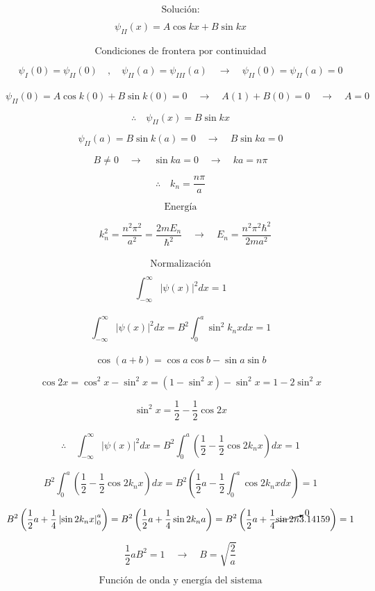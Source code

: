 \documentclass[10pt,a4papper]{article}
\begin{document}
\[\text{Solución:}\]

\[\psi_{II}(x)=A\cos kx+B\sin kx\]\\

\[\text{Condiciones de frontera por continuidad}\]

\[\psi_I(0)=\psi_{II}(0)\quad,\quad\psi_{II}(a)=\psi_{III}(a)\quad\to\quad
\psi_{II}(0)=\psi_{II}(a)=0\]\\

\[\psi_{II}(0)=A\cos k(0)+B\sin k(0)=0\quad\to\quad A(1)+B(0)=0\quad\to\quad A=0\]

\[\therefore\quad\psi_{II}(x)=B\sin kx\]

\[\psi_{II}(a)=B\sin k(a)=0\quad\to\quad B\sin ka=0\]

\[B\not=0\quad\to\quad\sin ka=0\quad\to\quad ka=n\pi\]

\[\boxed{\therefore\quad k_n=\frac{n\pi}{a}}\]

\newpage
\[\text{Energía}\]

\[\quad k_n^2=\frac{n^2\pi^2}{a^2}=\frac{2mE_n}{\hbar^2}\quad\to\quad
\boxed{E_n=\frac{n^2\pi^2\hbar^2}{2ma^2}}\]\\

\[\text{Normalización}\]

\[\int_{-\infty}^\infty|\psi(x)|^2dx=1\]\\

\[\int_{-\infty}^\infty|\psi(x)|^2dx=
B^2\int_0^a\sin^2k_nxdx=1\]\\

\[\cos(a+b)=\cos a\cos b-\sin a\sin b\]

\[\cos 2x=\cos^2x-\sin^2x=(1-\sin^2x)-\sin^2x=1-2\sin^2x\]

\[\sin^2x=\frac{1}{2}-\frac{1}{2}\cos 2x\]\\

\[\therefore\quad
\int_{-\infty}^\infty|\psi(x)|^2dx=
B^2\int_0^a\left(\frac{1}{2}-\frac{1}{2}\cos 2k_nx\right)dx=1\]

\[B^2\int_0^a\left(\frac{1}{2}-\frac{1}{2}\cos 2k_nx\right)dx=
B^2\left(\frac{1}{2}a-\frac{1}{2}\int_0^a\cos 2k_nxdx\right)=1\]

\[B^2\left(\frac{1}{2}a+\frac{1}{4}\left|\sin 2k_nx\right|_0^a\right)=
B^2\left(\frac{1}{2}a+\frac{1}{4}\sin 2k_na\right)=
B^2\left(\frac{1}{2}a+\frac{1}{4}\cancelto{0}{\sin 2n}\pi\right)=1\]

\[\frac{1}{2}aB^2=1\quad\to\quad\boxed{B=\sqrt{\frac{2}{a}}}\]

\newpage
\[\text{Función de onda y energía del sistema}\]
\end{document}
